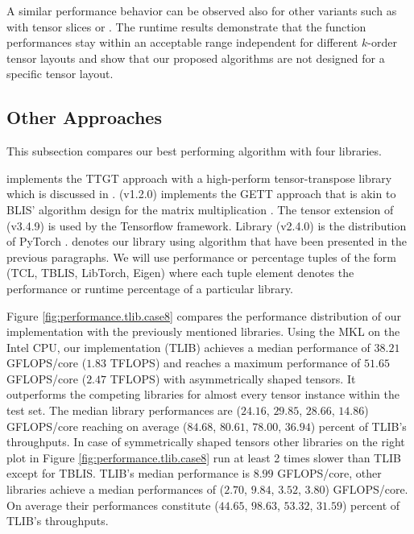 A similar performance behavior can be observed also for other  variants such as  with tensor slices or .
The runtime results demonstrate that the function performances stay within an acceptable range independent for different $k$-order tensor layouts and show that our proposed algorithms are not designed for a specific tensor layout.

\subsection{Other Approaches}
This subsection compares our best performing algorithm with four libraries.

 implements the TTGT approach with a high-perform tensor-transpose library  which is discussed in \cite{springer:2018:design}.
 (v1.2.0) implements the GETT approach that is akin to BLIS' algorithm design for the matrix multiplication \cite{matthews:2018:high}.
The tensor extension of  (v3.4.9) is used by the Tensorflow framework.
Library  (v2.4.0) is the  distribution of PyTorch \cite{paszke:2019:pytorch}.
 denotes our library using algorithm  that have been presented in the previous paragraphs.
We will use performance or percentage tuples of the form (TCL, TBLIS, LibTorch, Eigen) where each tuple element denotes the performance or runtime percentage of a particular library.


Figure \ref{fig:performance.tlib.case8} compares the performance distribution of our implementation with the previously mentioned libraries.
Using the MKL on the Intel CPU, our implementation (TLIB) achieves a median performance of $38.21$ GFLOPS/core ($1.83$ TFLOPS) and reaches a maximum performance of $51.65$ GFLOPS/core ($2.47$ TFLOPS) with asymmetrically shaped tensors.
It outperforms the competing libraries for almost every tensor instance within the test set.
The median library performances are ($24.16$, $29.85$, $28.66$, $14.86$) GFLOPS/core reaching on average ($84.68$, $80.61$, $78.00$, $36.94$) percent of TLIB's throughputs.
In case of symmetrically shaped tensors other libraries on the right plot in Figure \ref{fig:performance.tlib.case8} run at least 2 times slower than TLIB except for TBLIS.
TLIB's median performance is $8.99$ GFLOPS/core, other libraries achieve a median performances of ($2.70$, $9.84$, $3.52$, $3.80$) GFLOPS/core.
On average their performances constitute ($44.65$, $98.63$, $53.32$, $31.59$) percent of TLIB's throughputs.

